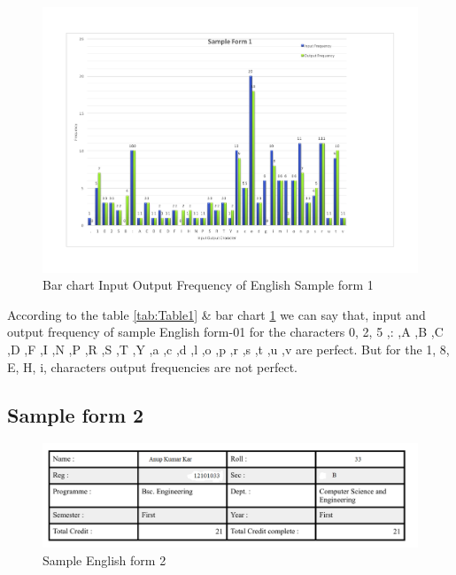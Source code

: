 \begin{figure}[H]
\centering
\includegraphics[width=1\textwidth]{form1.pdf}
\caption {Bar chart Input Output Frequency of English Sample form 1}
\label {fig:bar1}
\end{figure}
According to the table \ref{tab:Table1} \& bar chart \ref{fig:bar1} we can say that, input and output frequency of sample English form-01 for the characters 0, 2, 5 ,: ,A ,B ,C ,D ,F ,I ,N ,P ,R ,S ,T ,Y ,a ,c ,d ,l ,o ,p ,r ,s ,t ,u ,v are perfect. But for the 1, 8, E, H, i, characters output frequencies are not perfect. 
\subsection{Sample form 2}

\begin{figure}[H]
\centering
\includegraphics[width=1\textwidth]{form2.png}
\caption {Sample English form 2}
\label {fig:form2}
\end{figure}

